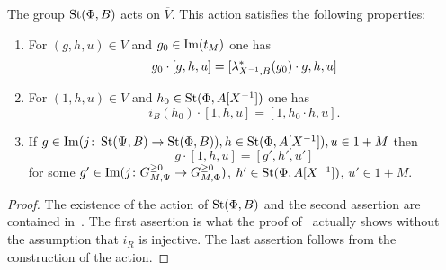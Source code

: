 \begin{prop} \label{prop:horrocks-main} The group $\operatorname{St}(\Phi, B)$ acts on $\overline{V}$.
 This action satisfies the following properties:
    \begin{enumerate}
        \item For $(g, h, u) \in V$ and $g_0 \in \operatorname{Im}(t_M)$ one has
         \[g_0 \cdot [g, h, u] = [\lambda_{X^{-1}, B}^* (g_0) \cdot g, h, u]\]
        \item For $(1, h, u) \in V$ and $h_0 \in \operatorname{St}(\Phi, A[X^{-1}])$ one has
         \[ i_B(h_0) \cdot [1, h, u] = [1, h_0 \cdot h, u].\]
        \item If $g \in \operatorname{Im}(j\colon \operatorname{St}(\Psi, B) \to \operatorname{St}(\Phi, B)), h \in \operatorname{St}(\Phi, A[X^{-1}]), u \in 1 + M$ then
         \[ g \cdot [1, h, u] = [g', h', u']\] for some $g' \in \operatorname{Im}(j\colon G_{M, \Psi}^{\geq 0} \to G_{M, \Phi}^{\geq 0})$, $h' \in \operatorname{St}(\Phi, A[X^{-1}])$, $u'\in 1 + M$.
    \end{enumerate}
\end{prop}
\begin{proof}
    The existence of the action of $\operatorname{St}(\Phi, B)$ and the second assertion are contained in~\cite[Proposition~5.39]{LS20}.
    The first assertion is what the proof of~\cite[Lemma~5.41]{LS20} actually shows without the assumption that $i_R$ is injective.
    The last assertion follows from the construction of the action. %
\end{proof}

